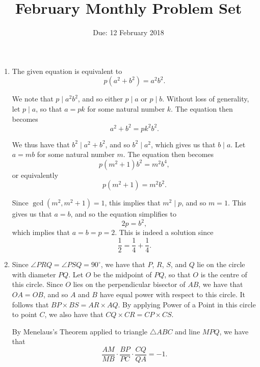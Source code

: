 \documentclass[12pt]{article}
\title{\vspace{-24pt}February Monthly Problem Set}
\author{Due: 12 February 2018}
\date{}
\begin{document}
 \maketitle \pagestyle{empty}

\begin{enumerate}

\item %
The given equation is equivalent to
\[
    p(a^2 + b^2) = a^2 b^2.
\]

We note that $p \mid a^2 b^2$, and so either $p \mid a$ or $p \mid
b$. Without loss of generality, let $p \mid a$, so that $a = pk$ for some
natural number $k$. The equation then becomes
\[
    a^2 + b^2 = pk^2 b^2.
\]

We thus have that $b^2 \mid a^2 + b^2$, and so $b^2 \mid a^2$, which
gives us that $b \mid a$. Let $a = mb$ for some natural number $m$. The
equation then becomes
\[
    p(m^2 + 1) b^2 = m^2 b^4,
\]
or equivalently
\[
    p(m^2 + 1) = m^2 b^2.
\]

Since $\gcd(m^2, m^2 + 1) = 1$, this implies that $m^2 \mid p$, and so $m =
1$. This gives us that $a = b$, and so the equation simplifies to
\[
    2p = b^2,
\]
which implies that $a = b = p = 2$. This is indeed a solution since
\[
    \frac{1}{2} = \frac{1}{4} + \frac{1}{4}.
\]

\item %
Since $\angle PRQ = \angle PSQ = 90^\circ$, we have that $P$, $R$, $S$, and $Q$
lie on the circle with diameter $PQ$. Let $O$ be the midpoint of $PQ$, so that
$O$ is the centre of this circle. Since $O$ lies on the perpendicular bisector
of $AB$, we have that $OA = OB$, and so $A$ and $B$ have equal power with
respect to this circle. It follows that $BP \times BS = AR \times AQ$. By
applying Power of a Point in this circle to point $C$, we also have that $CQ
\times CR = CP \times CS$.

By Menelaus's Theorem applied to triangle $\triangle ABC$ and line $MPQ$, we have that
\[
    \frac{AM}{MB} \cdot \frac{BP}{PC} \cdot \frac{CQ}{QA} = -1.
\]


\end{enumerate}
\end{document}
